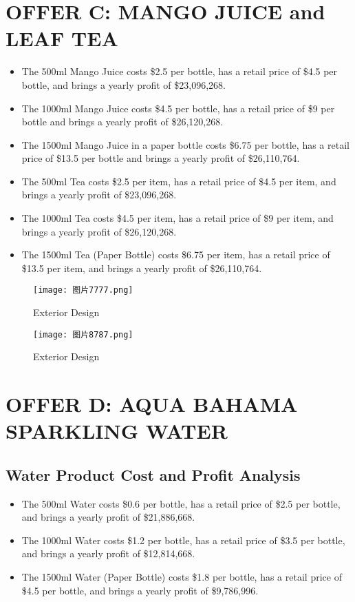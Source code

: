 \documentclass{article}
\begin{document}
\section{OFFER C: MANGO JUICE and LEAF TEA}
\begin{itemize}
    \item The 500ml Mango Juice costs \$2.5 per bottle, has a retail price of \$4.5 per bottle, and brings a yearly profit of \$23,096,268.
    \item The 1000ml Mango Juice costs \$4.5 per bottle, has a retail price of \$9 per bottle and brings a yearly profit of \$26,120,268.
    \item The 1500ml Mango Juice in a paper bottle costs \$6.75 per bottle, has a retail price of \$13.5 per bottle and brings a yearly profit of \$26,110,764.
\end{itemize}
\begin{itemize}
    \item The 500ml Tea costs \$2.5 per item, has a retail price of \$4.5 per item, and brings a yearly profit of \$23,096,268.
    \item The 1000ml Tea costs \$4.5 per item, has a retail price of \$9 per item, and brings a yearly profit of \$26,120,268.
    \item The 1500ml Tea (Paper Bottle) costs \$6.75 per item, has a retail price of \$13.5 per item, and brings a yearly profit of \$26,110,764.
\end{itemize}




\begin{figure}[H]
\centering
\texttt{[image: 图片7777.png]}
\caption{Exterior Design}
\end{figure}
\begin{figure}[H]
\centering
\texttt{[image: 图片8787.png]}
\caption{Exterior Design}
\end{figure}



\section{OFFER D: AQUA BAHAMA SPARKLING WATER}

\subsection*{Water Product Cost and Profit Analysis}


\begin{itemize}
    \item The 500ml Water costs \$0.6 per bottle, has a retail price of \$2.5 per bottle, and brings a yearly profit of \$21,886,668.
    \item The 1000ml Water costs \$1.2 per bottle, has a retail price of \$3.5 per bottle, and brings a yearly profit of \$12,814,668.
    \item The 1500ml Water (Paper Bottle) costs \$1.8 per bottle, has a retail price of \$4.5 per bottle, and brings a yearly profit of \$9,786,996.
\end{itemize}
\end{document}
